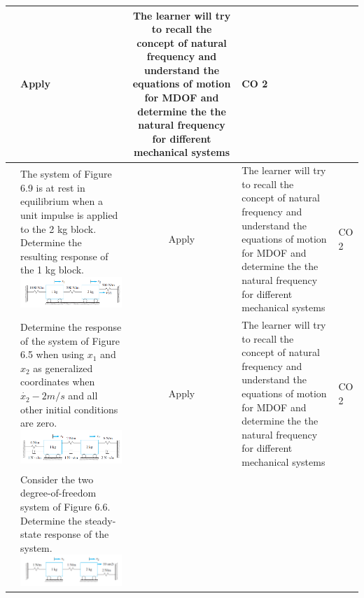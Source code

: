 \documentclass[11pt,paper=a4,answers]{exam}
\begin{document}
\begin{flushleft}
\begin{longtable}{|>{\centering\arraybackslash}p{0.8cm}  | >{\raggedright\arraybackslash}p{6.5cm}  | c | >{\raggedright\arraybackslash}p{5cm} |>{\centering\arraybackslash}p{1cm}|}
&	Apply&	The learner will try to recall the concept of natural frequency and understand the equations of motion for MDOF and determine the the natural frequency for different mechanical systems &	CO 2\\
\hline
13 & The system of Figure 6.9 is at rest in equilibrium when a unit impulse is applied to the 2 kg
block. Determine the resulting response of the 1 kg block.
\includegraphics[scale=0.4]{6.9.png}
&	Apply&	The learner will try to recall the concept of natural frequency and understand the equations of motion for MDOF and determine the the natural frequency for different mechanical systems &	CO 2\\
\hline 
14 & Determine the response of the system of Figure 6.5 when using $x_{1}$ and $x_{2}$ as generalized
coordinates when $\dot{x_{2}}-2m/s$ and all other initial conditions are zero.
\includegraphics[scale=0.4]{6.5.png}
&	Apply&	The learner will try to recall the concept of natural frequency and understand the equations of motion for MDOF and determine the the natural frequency for different mechanical systems &	CO 2\\
\hline
15& Consider the two degree-of-freedom system of Figure 6.6. Determine the steady-state
response of the system.
\includegraphics[scale=0.4]{6.6.png}

\end{longtable}
\end{flushleft}
\end{document}
